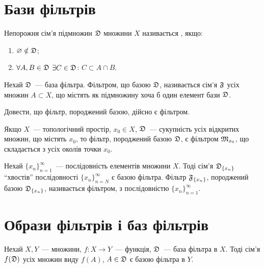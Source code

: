 \section{Бази фільтрів}

\begin{definition}
    Непорожня сім'я підмножин $\frak D$ множини $X$ називається , якщо:
    \begin{enumerate}
        \item $\emptyset \notin \frak D$;
        \item $\forall A, B \in \frak D$ $\exists C \in \frak D$: $C \subset A \cap B$.
    \end{enumerate}
\end{definition}

\begin{definition}
    Нехай $\frak D$~--- база фільтра. Фільтром, що  базою $\frak D$, називається сім'я $\frak F$ усіх множин $A \subset X$, що містять як підмножину хоча б один елемент бази $\frak D$.
\end{definition}

\begin{exercise}
    Довести, що фільтр, породжений базою, дійсно є фільтром.
\end{exercise}

\begin{example}
    Якщо $X$~--- топологічний простір, $x_0 \in X$, $\frak D$~--- сукупність усіх відкритих множин, що містять $x_0$, то фільтр, породжений базою $\frak D$, є фільтром $\frak M_{x_0}$, що складається з усіх околів точки $x_0$.
\end{example}

\begin{definition}
    Нехай $\{x_n\}_{n = 1}^\infty$~--- послідовність елементів множини $X$. Тоді сім'я $\frak D_{\{x_n\}}$ ``хвостів'' послідовності $\{x_n\}_{n = N}^\infty$ є базою фільтра. Фільтр $\frak F_{\{x_n\}}$, породжений базою $\frak D_{\{x_n\}}$, називається фільтром,  з послідовністю $\{x_n\}_{n = 1}^\infty$.
\end{definition}

\section{Образи фільтрів і баз фільтрів}

\begin{theorem}
    \label{th:filterbase-image-filterbase}
    Нехай $X, Y$~--- множини, $f: X \to Y$~--- функція, $\frak D$~--- база фільтра в $X$. Тоді сім'я $f(\frak D)$ усіх множин виду $f(A)$, $A \in \frak D$ є базою фільтра в $Y$.
\end{theorem}

